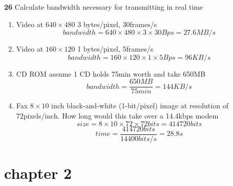 \documentclass[11pt]{article}
\begin{document}
\textbf{26} Calculate bandwidth necessary for transmitting in real time
\begin{enumerate}
    \item Video at $640\times 480$ 3 bytes/pixel, 30frames/s 
    \[
        bandwidth = 640\times 480 \times 3 \times 30 Bps = 27.6MB/s
    \]
    \item Video at $160\times 120$ 1 bytes/pixel, 5frames/s 
    \[
        bandwidth = 160\times 120 \times 1 \times 5 Bps = 96KB/s
    \]
    \item CD ROM assume 1 CD holds 75min worth and take 650MB
    \[
        bandwidth = \frac{650MB}{75min} = 144KB/s
    \]
    \item Fax $8\times 10$ inch black-and-white (1-bit/pixel) image at resolution of 72pixels/inch. How long would this take over a 14.4kbps modem
    \[
        size = 8\times 10 \times 72 \times 72 bits= 414720 bits
    \]
    \[
        time = \frac{414720 bits}{14400 bits/s} = 28.8s 
    \]
\end{enumerate}




\section*{chapter 2}
\end{document}

